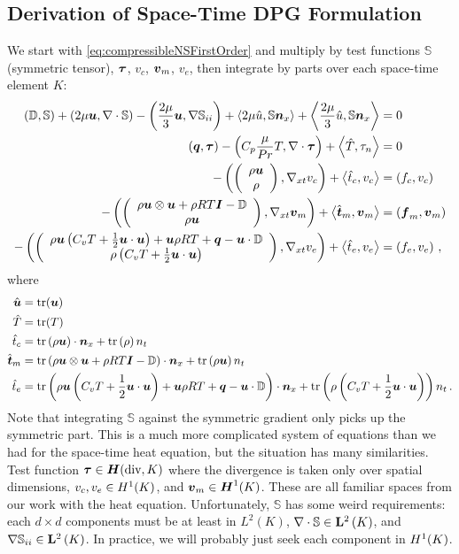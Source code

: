 \documentclass[Proposal.tex]{subfiles}
\begin{document}
\subsection{Derivation of Space-Time DPG Formulation}
We start with \eqref{eq:compressibleNSFirstOrder} and multiply by test functions $\mathbb{S}$ (symmetric tensor), $\boldsymbol\tau$, $v_c$, $\boldsymbol v_m$, $v_e$, 
then integrate by parts over each space-time element $K$:
\begin{subequations}
\label{eq:compressibleNSBF}
\begin{align}
	\left( \mathbb{D},\mathbb{S} \right)+\left( 2\mu\boldsymbol u,\nabla\cdot\mathbb{S} \right)-\left( \frac{2\mu}{3}\boldsymbol u,\nabla\mathbb{S}_{ii} \right)
	+\left\langle 2\mu\hat u,\mathbb{S}\boldsymbol n_x \right\rangle+\left\langle \frac{2\mu}{3}\hat u,\mathbb{S}\boldsymbol n_x \right\rangle&=0\\
	\left( \boldsymbol q,\boldsymbol\tau \right)-\left( C_p\frac{\mu}{Pr}T,\nabla\cdot\boldsymbol\tau \right)+\left\langle \hat T,\tau_n \right\rangle&=0\\
	-\left( \left( \begin{array}{c} \rho\boldsymbol u\\ \rho\\ \end{array} \right),\nabla_{xt} v_c \right)+\left\langle \hat t_c,v_c \right\rangle&=\left( f_c,v_c \right)\\
	-\left( \left( \begin{array}{c} \rho\boldsymbol u\otimes\boldsymbol u+\rho RT\boldsymbol I-\mathbb{D}\\ \rho\boldsymbol u\\ \end{array} \right),\nabla_{xt}\boldsymbol v_m \right)+\left\langle \hat{\boldsymbol t}_m,\boldsymbol v_m \right\rangle&=\left( \boldsymbol f_m,\boldsymbol v_m \right)\\
	-\left( \left( \begin{array}{c} \rho\boldsymbol u\left( C_v T+\frac{1}{2}\boldsymbol u\cdot\boldsymbol u \right)+\boldsymbol u\rho RT+\boldsymbol q-\boldsymbol u\cdot\mathbb{D}\\ \rho\left( C_v T+\frac{1}{2}\boldsymbol u\cdot\boldsymbol u \right)\\ \end{array} \right),\nabla_{xt} v_e \right)
	+\left\langle \hat t_e,v_e \right\rangle&=\left( f_e,v_e \right)\,,
\end{align}
\end{subequations}
where 
\begin{equation*}
\begin{aligned}
\hat{\boldsymbol u}&=\operatorname*{tr}(\boldsymbol u)\\
\hat T&=\operatorname*{tr}(T)\\
\hat t_c&=\operatorname*{tr}\left( \rho\boldsymbol u \right)\cdot\boldsymbol n_x
+\operatorname*{tr}\left( \rho \right)n_t\\
\hat{\boldsymbol t}_m&=\operatorname*{tr}\left( \rho\boldsymbol u\otimes\boldsymbol u+\rho RT\boldsymbol I-\mathbb{D} \right)\cdot\boldsymbol n_x
+\operatorname*{tr}\left( \rho\boldsymbol u \right) n_t\\
\hat t_e&=\operatorname*{tr}\left( \rho\boldsymbol u\left( C_v T+\frac{1}{2}\boldsymbol u\cdot\boldsymbol u \right)+\boldsymbol u\rho RT+\boldsymbol q-\boldsymbol u\cdot\mathbb{D} \right)\cdot\boldsymbol n_x
+\operatorname*{tr}\left( \rho\left( C_v T+\frac{1}{2}\boldsymbol u\cdot\boldsymbol u \right) \right)n_t\,.
\end{aligned}
\end{equation*}
Note that integrating $\mathbb{S}$ against the symmetric gradient only picks up the symmetric part.
This is a much more complicated system of equations than we had for the space-time heat equation, but the situation has many similarities.
Test function $\boldsymbol\tau\in\mbox{\boldmath $H$}(\text{div},K)$ where the divergence is taken only over spatial dimensions, $v_c,v_e\in H^{1}(K)$, and $\boldsymbol v_m\in\mbox{\boldmath $H$}^{1}(K)$.
These are all familiar spaces from our work with the heat equation.
Unfortunately, $\mathbb{S}$ has some weird requirements: each $d\times d$ components must be at least in $L^2(K)$, $\nabla\cdot\mathbb{S}\in\mathbf{L}^2\left( K \right)$, and
$\nabla\mathbb{S}_{ii}\in\mathbf{L}^2\left( K \right)$.
In practice, we will probably just seek each component in $H^{1}(K)$.
\end{document}
